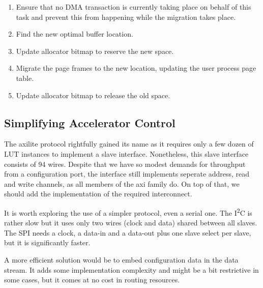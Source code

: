 \begin{enumerate}
\item	Ensure that no DMA transaction is currently taking place on behalf of this task 
	and prevent this from happening while the migration takes place.
\item	Find the new optimal buffer location.
\item	Update allocator bitmap to reserve the new space.
\item	Migrate the page frames to the new location, updating the user process page table.
\item	Update allocator bitmap to release the old space.
\end{enumerate}


\subsection{Simplifying Accelerator Control}

The \gls{axilite} protocol rightfully gained its name as it requires only a few dozen of LUT instances to implement a slave interface.
Nonetheless, this slave interface consists of 94 wires. Despite that we have so modest demands for throughput from a configuration
port, the interface still implements seperate address, read and write channels, as all members of the \gls{axi} family do.
On top of that, we should add the implementation of the required interconnect.

It is worth exploring the use of a simpler protocol, even a serial one. The I\textsuperscript{2}C is rather slow but it uses only
two wires (clock and data) shared between all slaves. The SPI needs a clock, a data-in and a data-out plus one slave select per slave,
but it is significantly faster.

A more efficient solution would be to embed configuration data in the data stream. It adds some implementation complexity
and might be a bit restrictive in some cases, but it comes at no cost in routing resources.



